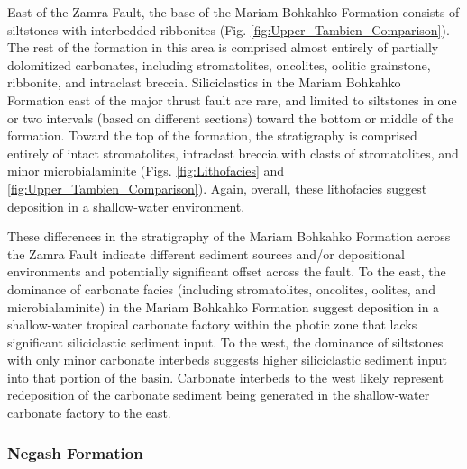 \documentclass[11pt,letterpaper]{article}
\begin{document}
East of the Zamra Fault, the base of the Mariam Bohkahko Formation consists of siltstones with interbedded ribbonites (Fig. \ref{fig:Upper_Tambien_Comparison}). The rest of the formation in this area is comprised almost entirely of partially dolomitized carbonates, including stromatolites, oncolites, oolitic grainstone, ribbonite, and intraclast breccia. Siliciclastics in the Mariam Bohkahko Formation east of the major thrust fault are rare, and limited to siltstones in one or two intervals (based on different sections) toward the bottom or middle of the formation. Toward the top of the formation, the stratigraphy is comprised entirely of intact stromatolites, intraclast breccia with clasts of stromatolites, and minor microbialaminite (Figs. \ref{fig:Lithofacies} and \ref{fig:Upper_Tambien_Comparison}). Again, overall, these lithofacies suggest deposition in a shallow-water environment.

These differences in the stratigraphy of the Mariam Bohkahko Formation across the Zamra Fault indicate different sediment sources and/or depositional environments and potentially significant offset across the fault. To the east, the dominance of carbonate facies (including stromatolites, oncolites, oolites, and microbialaminite) in the Mariam Bohkahko Formation suggest deposition in a shallow-water tropical carbonate factory within the photic zone that lacks significant siliciclastic sediment input. To the west, the dominance of siltstones with only minor carbonate interbeds suggests higher siliciclastic sediment input into that portion of the basin. Carbonate interbeds to the west likely represent redeposition of the carbonate sediment being generated in the shallow-water carbonate factory to the east.

\subsubsection*{Negash Formation}
\end{document}
